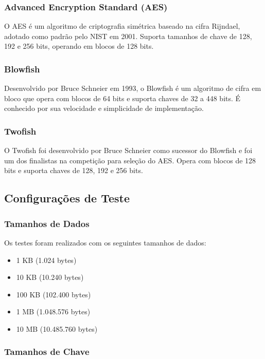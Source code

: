 \documentclass[12pt,a4paper,oneside]{article}
\begin{document}
\subsubsection{Advanced Encryption Standard (AES)}

O AES é um algoritmo de criptografia simétrica baseado na cifra Rijndael, adotado como padrão pelo NIST em 2001. Suporta tamanhos de chave de 128, 192 e 256 bits, operando em blocos de 128 bits.

\subsubsection{Blowfish}

Desenvolvido por Bruce Schneier em 1993, o Blowfish é um algoritmo de cifra em bloco que opera com blocos de 64 bits e suporta chaves de 32 a 448 bits. É conhecido por sua velocidade e simplicidade de implementação.

\subsubsection{Twofish}

O Twofish foi desenvolvido por Bruce Schneier como sucessor do Blowfish e foi um dos finalistas na competição para seleção do AES. Opera com blocos de 128 bits e suporta chaves de 128, 192 e 256 bits.

\subsection{Configurações de Teste}

\subsubsection{Tamanhos de Dados}

Os testes foram realizados com os seguintes tamanhos de dados:
\begin{itemize}
    \item 1 KB (1.024 bytes)
    \item 10 KB (10.240 bytes)
    \item 100 KB (102.400 bytes)
    \item 1 MB (1.048.576 bytes)
    \item 10 MB (10.485.760 bytes)
\end{itemize}

\subsubsection{Tamanhos de Chave}
\end{document}
